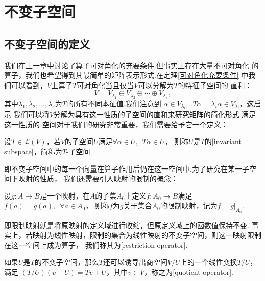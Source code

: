 \chapter{不变子空间}

\section{不变子空间的定义}
我们在上一章中讨论了算子可对角化的充要条件.但事实上存在大量不可对角化
的算子，我们也希望得到其最简单的矩阵表示形式.在定理\ref{可对角化充要条件} %
中我们可以看到，$V$上算子$T$可对角化当且仅当$V$可以分解为$T$的特征子空间的
直和：\[V=V_{\lambda_1}\oplus V_{\lambda_2}\oplus\cdots\oplus V_{\lambda_s},\]
其中$\lambda_1,\lambda_2,\ldots,\lambda_s$为$T$的所有不同本征值.我们注意到
$\alpha\in V_{\lambda_i},\enspace T\alpha=\lambda_i\alpha\in V_{\lambda_i}$，这启示
我们可以将$V$分解为具有这一性质的子空间的直和来研究矩阵的简化形式.满足这一性质的
空间对于我们的研究非常重要，我们需要给予它一个定义：
\begin{definition}
    设$T\in \mathcal{L}(V)$，若$V$的子空间$U$满足$\forall \alpha\in U,\enspace T\alpha\in U$，
    则称$U$是$T$的[invariant subspace]，简称为$T$-子空间.
\end{definition}
即不变子空间中的每一个向量在算子作用后仍在这一空间中.为了研究在某一子空间下映射的性质，
我们还需要引入映射的限制的概念：
\begin{definition}
    设$g:A\to B$是一个映射，在$A$的子集$A_0$上定义$f:A_0\to B$满足$f(a)=g(a),\enspace\forall a\in A_0$，
    则称$f$为$g$关于集合$A_0$的限制映射，记为$f=g\vert_{A_0}$.
\end{definition}
即限制映射就是将原映射的定义域进行收缩，但原定义域上的函数值保持不变.
事实上，若映射为线性映射，限制的集合为线性映射的不变子空间，则这一映射限制在这一空间上成为算子，
我们称其为[restriction operator].

如果$U$是$T$的不变子空间，那么$T$还可以诱导出商空间$V/U$上的一个线性变换$T/U$，满足
$(T/U)(v+U)=Tv+U$，其中$v\in V$，称之为[quotient operator].

